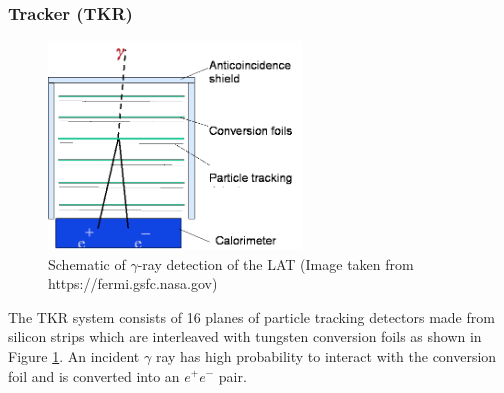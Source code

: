 \subsubsection{Tracker (TKR)}

\begin{figure}[h!]
    \centering
    \includegraphics[width=0.6\textwidth]{content/background/figures/LAT_layers.png}
    \caption{
        Schematic of $\gamma$-ray detection of the LAT
        (Image taken from https://fermi.gsfc.nasa.gov)
    }
    \label{fig:fermi_lat_layers}
\end{figure}


The TKR system consists of 16 planes of particle tracking detectors
made from silicon strips which are interleaved with tungsten
conversion foils as shown in Figure \ref{fig:fermi_lat_layers}.
An incident
$\gamma$ ray has high probability to interact with the conversion
foil and is converted into an $e^+e^-$ pair. 

